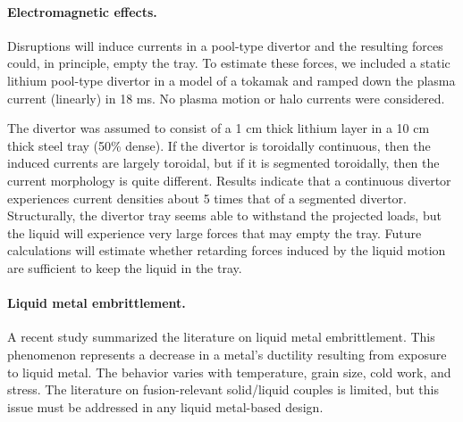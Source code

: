 \paragraph{Electromagnetic effects. } Disruptions will induce currents in
a pool-type divertor and the resulting forces could, in principle, empty the
tray. To estimate these forces, we included a static lithium pool-type
divertor in a model of a tokamak and ramped down the plasma current (linearly)
in 18 ms. No plasma motion or halo currents were considered.

The divertor was assumed to consist of a 1 cm thick lithium layer in a 10 cm
thick steel tray (50\% dense). If the divertor is toroidally continuous, then
the induced currents are largely toroidal, but if it is segmented toroidally,
then the current morphology is quite different. Results indicate that a
continuous divertor experiences current densities about 5 times that of a
segmented divertor. Structurally, the divertor tray seems able to withstand
the projected loads, but the liquid will experience very large forces that may
empty the tray. Future calculations will estimate whether retarding forces
induced by the liquid motion are sufficient to keep the liquid in the tray.

\paragraph{Liquid metal embrittlement. } A recent study summarized the
literature on liquid metal embrittlement. This phenomenon represents a
decrease in a metal’s ductility resulting from exposure to liquid metal. The
behavior varies with temperature, grain size, cold work, and stress. The
literature on fusion-relevant solid/liquid couples is limited, but this issue
must be addressed in any liquid metal-based design.

